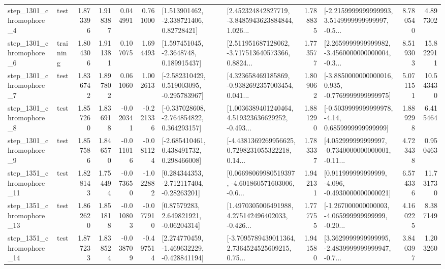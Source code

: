 \begin{tabular}{llrrrrllrlrr}
  step\_1301\_chromophore\_4 &      test &      1.873396 &    1.918387 &      0.044991 &  0.761000 &     [1.513901462, -2.338721406, 0.82728421] &  [2.452324842827719, -3.8485943623884844, 1.026... &       1.788835 &  [-2.2159999999999993, 3.5149999999999997, -0.5... &            8.780540 &          4.897302 \\
  step\_1301\_chromophore\_6 &  training &      1.804306 &    1.911381 &      0.107075 &  1.694493 &      [1.597451045, -2.3648748, 0.189915437] &  [2.511951687128062, -3.717513640573366, 0.8824... &       1.773577 &  [2.2659999999999982, -3.4560000000000004, -0.3... &            8.519303 &         15.822911 \\
  step\_1301\_chromophore\_7 &      test &      1.836742 &    1.897802 &      0.061060 &  1.002613 &   [-2.582310429, 0.519003095, -0.295783967] &  [4.323658469185869, -0.9382692357003454, 0.041... &       1.809062 &  [-3.8850000000000016, 0.935, -0.7769999999999975] &            5.071151 &         10.543430 \\
  step\_1301\_chromophore\_8 &      test &      1.857260 &    1.836918 &     -0.020341 & -0.221336 &   [-0.337028608, -2.764854822, 0.364293157] &  [1.0036389401240464, 4.519323636629252, -0.493... &       1.881290 &   [-0.5039999999999978, -4.14, 0.6859999999999999] &            1.889298 &          6.415464 \\
  step\_1301\_chromophore\_9 &      test &      1.857586 &    1.846570 &     -0.011016 & -0.081124 &    [-2.685410461, 0.438491732, 0.298466008] &  [-4.4381369269956625, 0.7298231055322218, 0.14... &       1.783337 &  [4.052999999999997, -0.7340000000000001, -0.11... &            4.723438 &          0.950463 \\
 step\_1351\_chromophore\_11 &      test &      1.828143 &    1.754494 &     -0.073650 & -1.022882 &    [0.284344353, -2.712117404, -0.28263201] &  [0.06698069980519397, -4.601860571603006, -0.6... &       1.942131 &   [0.911999999999999, -4.096, -0.4930000000000021] &            6.574336 &         11.731730 \\
 step\_1351\_chromophore\_13 &      test &      1.862620 &    1.851818 &     -0.010803 & -0.077910 &      [0.87579283, 2.649821921, -0.06204314] &  [1.4970305006491988, 4.275142496402033, -0.426... &       1.777755 &  [-1.267000000000003, -4.065999999999999, -0.20... &            4.160225 &          8.387149 \\
 step\_1351\_chromophore\_14 &      test &      1.877233 &    1.838524 &     -0.038709 & -0.497514 &   [2.274770459, -1.469632229, -0.428841194] &  [-3.7095789439011364, 2.7364524525609215, 0.75... &       1.941580 &  [3.3629999999999995, -2.4839999999999947, -0.7... &            3.840397 &          1.203260 \\

\end{tabular}

